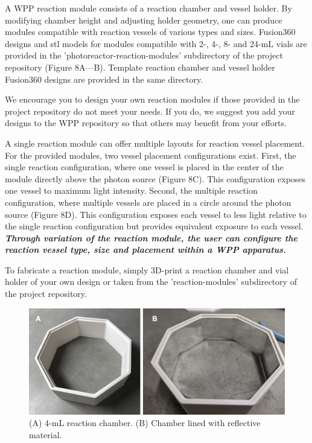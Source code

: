 \documentclass[11pt]{article}
\begin{document}
A WPP reaction module consists of a reaction chamber and vessel holder.
By modifying chamber height and adjusting holder geometry, one can produce modules compatible with reaction vessels of various types and sizes.
Fusion360 designs and stl models for modules compatible with 2-, 4-, 8- and 24-mL vials are provided in the 'photoreactor-reaction-modules' subdirectory of the project repository (Figure 8A—B).
Template reaction chamber and vessel holder Fusion360 designs are provided in the same directory.

We encourage you to design your own reaction modules if those provided in the project repository do not meet your needs.
If you do, we suggest you add your designs to the WPP repository so that others may benefit from your efforts.

A single reaction module can offer multiple layouts for reaction vessel placement.
For the provided modules, two vessel placement configurations exist.
First, the single reaction configuration, where one vessel is placed in the center of the module directly above the photon source (Figure 8C).
This configuration exposes one vessel to maximum light intensity.
Second, the multiple reaction configuration, where multiple vessels are placed in a circle around the photon source (Figure 8D).
This configuration exposes each vessel to less light relative to the single reaction configuration but provides equivalent exposure to each vessel.
\textbf{\textit{Through variation of the reaction module, the user can configure the reaction vessel type, size and placement within a WPP apparatus.}}

To fabricate a reaction module, simply 3D-print a reaction chamber and vial holder of your own design or taken from the 'reaction-modules' subdirectory of the project repository.

\begin{figure}[H]
	\centering
	\includegraphics[width=\textwidth]{"./fig9.png"}
	\caption{(A) 4-mL reaction chamber. (B) Chamber lined with reflective material.}
\end{figure}
\end{document}
